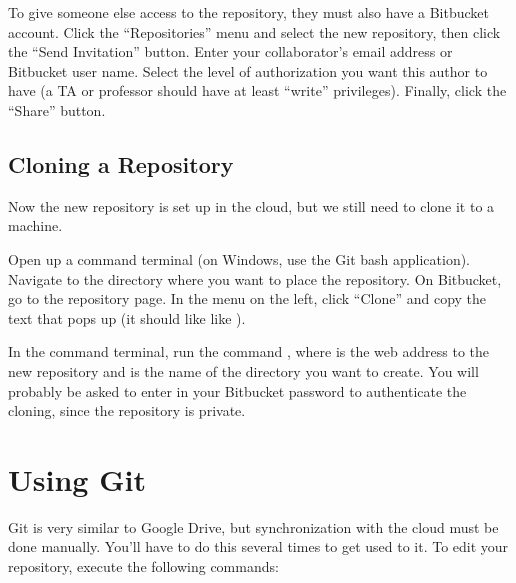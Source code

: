 To give someone else access to the repository, they must also have a Bitbucket account.
Click the ``Repositories'' menu and select the new repository, then click the ``Send Invitation'' button.
Enter your collaborator's email address or Bitbucket user name. %
Select the level of authorization you want this author to have (a TA or professor should have at least ``write'' privileges).
Finally, click the ``Share'' button.

\subsection*{Cloning a Repository} %

Now the new repository is set up in the cloud, but we still need to clone it to a machine.

Open up a command terminal (on Windows, use the Git bash application).
Navigate to the directory where you want to place the repository.
On Bitbucket, go to the repository page.
In the menu on the left, click ``Clone'' and copy the text that pops up (it should like like ).

In the command terminal, run the command
, where  is the web address to the new repository and  is the name of the directory you want to create.
You will probably be asked to enter in your Bitbucket password to authenticate the cloning, since the repository is private.
% 

\section*{Using Git} %

Git is very similar to Google Drive, but synchronization with the cloud must be done manually. You'll have to do this several times to get used to it. To edit your repository, execute the following commands:

